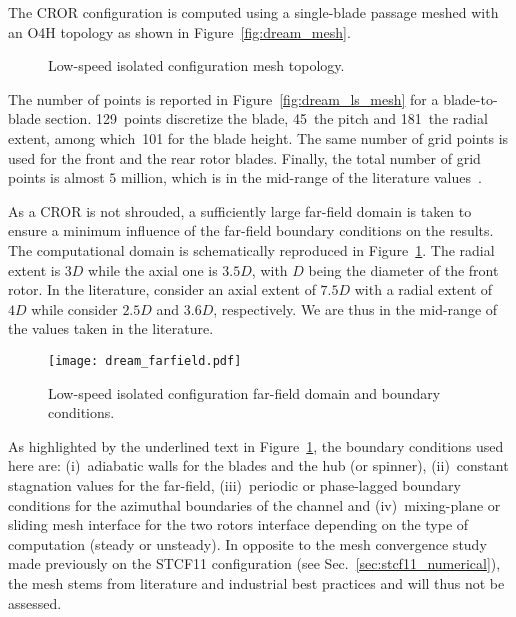 
The CROR configuration is computed using
a single-blade passage meshed
with an O4H topology as shown in Figure~\ref{fig:dream_mesh}.
\begin{figure}[htp]
  \centering
  \caption{Low-speed isolated configuration mesh topology.}
\end{figure}
The number of points is reported in 
Figure~\ref{fig:dream_ls_mesh} for a blade-to-blade section. 
129~points discretize the blade, 45~the pitch and 181~the radial
extent, among which~101 for the blade height. 
The same number of grid points is used for the front
and the rear rotor blades. 
Finally, the total number of grid points is almost $5$ million, which
is in the mid-range of the literature 
values~\cite{Stuermer2008,Bechet2011,
Francois2013,Zachariadis2011,Peters2012}.

As a CROR is not shrouded, a sufficiently large
far-field domain is taken to ensure a minimum influence
of the far-field boundary conditions on the results.
The computational domain is schematically reproduced 
in Figure~\ref{fig:dream_farfield}.
The radial extent is $3D$ while the axial one is $3.5D$, with
$D$ being the diameter of the front rotor.
In the literature, 
\citet{Peters2012} consider an axial extent of $7.5D$
with a radial extent of $4D$ while \citet{Zachariadis2011}
consider $2.5D$ and $3.6D$, respectively. We are thus in 
the mid-range of the values taken in the literature.
\begin{figure}[htp]
  \centering
  \texttt{[image: dream\_farfield.pdf]}
  \caption{Low-speed isolated configuration far-field domain and boundary conditions.}
  \label{fig:dream_farfield}
\end{figure}
As highlighted by the underlined text in Figure~\ref{fig:dream_farfield},
the boundary conditions used here are: (i)~adiabatic walls
for the blades and the hub (or spinner), (ii)~constant
stagnation values for the far-field, (iii)~periodic
or phase-lagged boundary conditions 
for the azimuthal boundaries of the channel
and (iv)~mixing-plane or sliding mesh interface for the
two rotors interface depending on the type of computation (steady or unsteady).
In opposite to the mesh convergence study made previously on the STCF11
configuration (see Sec.~\ref{sec:stcf11_numerical}),
the mesh stems from literature and industrial best
practices and will thus not be assessed.

